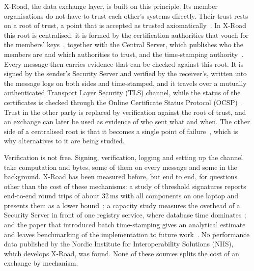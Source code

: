 \documentclass[conference,a4paper]{IEEEtran}
\begin{document}
X-Road, the data exchange layer, is built on this principle. Its member organisations do not have to trust each other's
systems directly. Their trust rests on a root of trust, a point that is accepted as trusted
axiomatically~\cite{bakhtina2023sac}. In X-Road this root is centralised: it is formed by the
certification authorities that vouch for the members' keys~\cite{bakhtina2023sac}, together with the
Central Server, which publishes who the members are and which authorities to trust, and the
time-stamping authority~\cite{xroadarcss}. Every message then carries evidence that can be checked
against this root. It is signed by the sender's Security Server and verified by the receiver's,
written into the message logs on both sides and time-stamped, and it travels over a mutually
authenticated Transport Layer Security (TLS) channel, while the status of the certificates is checked
through the Online Certificate Status Protocol (OCSP)~\cite{xroadarcss,ansper2013}. Trust in the other
party is replaced by verification against the root of trust, and an exchange can later be used as
evidence of who sent what and when. The other side of a centralised root is that it becomes a single
point of failure~\cite{bakhtina2023sac}, which is why alternatives to it are being studied.

Verification is not free. Signing, verification, logging and setting up the channel take
computation and bytes, some of them on every message and some in the background. X-Road has been
measured before, but end to end, for questions other than the cost of these mechanisms: a
study of threshold signatures reports end-to-end round trips of about 32\,ms with all components on
one laptop and presents them as a lower bound~\cite{bakhtina2026ijis}; a capacity study measures the
overhead of a Security Server in front of one registry service, where database time
dominates~\cite{taklai2020}; and the paper that introduced batch time-stamping gives an analytical
estimate and leaves benchmarking of the implementation to future work~\cite{ansper2013}. No performance
data published by the Nordic Institute for Interoperability Solutions (NIIS), which develops X-Road,
was found. None of these sources splits the cost of an exchange by mechanism.
\end{document}
